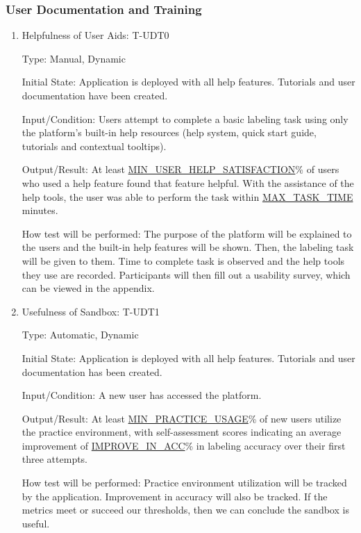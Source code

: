 \documentclass[12pt, titlepage]{article}
\begin{document}
\subsubsection{User Documentation and Training}

\begin{enumerate}

\item{Helpfulness of User Aids: T-UDT0\\}

Type: Manual, Dynamic
					
Initial State: Application is deployed with all help features. Tutorials and user documentation have been created.
					
Input/Condition: Users attempt to complete a basic labeling task using only the platform’s built-in help resources (help system, quick start guide, tutorials and contextual tooltips).
					
Output/Result: At least \hyperref[MIN_USER_HELP_SATISFACTION]{MIN\_USER\_HELP\_SATISFACTION}\% of users who used a help feature found that feature helpful. With the assistance of the help tools, the user was able to perform the task within \hyperref[MAX_TASK_TIME]{MAX\_TASK\_TIME} minutes.
					
How test will be performed: The purpose of the platform will be explained to the users and the built-in help features will be shown. Then, the labeling task will be given to them. Time to complete task is observed and the help tools they use are recorded. Participants will then fill out a usability survey, which can be viewed in the appendix.

\item{Usefulness of Sandbox: T-UDT1\\}

Type: Automatic, Dynamic
					
Initial State: Application is deployed with all help features. Tutorials and user documentation has been created.
					
Input/Condition: A new user has accessed the platform.
					
Output/Result: At least \hyperref[MIN_PRACTICE_USAGE]{MIN\_PRACTICE\_USAGE}\% of new users utilize the practice environment, with self-assessment scores indicating an average improvement of \hyperref[IMPROVE_IN_ACC]{IMPROVE\_IN\_ACC}\% in labeling accuracy over their first three attempts.
					
How test will be performed: Practice environment utilization will be tracked by the application. Improvement in accuracy will also be tracked. If the metrics meet or succeed our thresholds, then we can conclude the sandbox is useful.
\end{enumerate}
\end{document}

